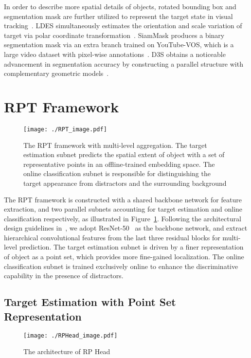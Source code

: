 \documentclass[runningheads]{llncs}
\begin{document}
In order to describe more spatial details of objects, rotated bounding box and segmentation mask are further utilized to represent the target state in visual tracking~\cite{ldes,siamMask,D3S}. LDES simultaneously estimates the orientation and scale variation of target via polar coordinate transformation~\cite{ldes}. SiamMask produces a binary segmentation mask via an extra branch trained on YouTube-VOS\cite{youtubevos}, which is a large video dataset with pixel-wise annotations~\cite{siamMask}. D3S obtains a noticeable advancement in segmentation accuracy by constructing a parallel structure with complementary geometric models~\cite{D3S}.


\section{RPT Framework}


\begin{figure}[t]
\centering
\texttt{[image: ./RPT\_image.pdf]}
\caption{The RPT framework with multi-level aggregation. The target estimation subnet predicts the spatial extent of object with a set of representative points in an offline-trained embedding space. The online classification subnet is responsible for distinguishing the target appearance from distractors and the surrounding background}
\label{fig:RPT_structure}
\end{figure}

The RPT framework is constructed with a shared backbone network for
feature extraction, and two parallel subnets accounting for
target estimation and online classification respectively, as illustrated in Figure~\ref{fig:RPT_structure}. Following the architectural
design guidelines in~\cite{CIR}, we adopt ResNet-50~\cite{resnet50} as the backbone
network, and extract hierarchical convolutional features from the last
three residual blocks for multi-level prediction. The target estimation
subnet is driven by a finer representation of object as a point set,
which provides more fine-gained localization. The online classification
subnet is trained exclusively online to enhance the discriminative capability in the presence of distractors.

\subsection{Target Estimation with Point Set Representation}

\begin{figure}[t]
\centering
\texttt{[image: ./RPHead\_image.pdf]}
\caption{The architecture of RP Head}
\label{fig:RPHead}
\end{figure}
\end{document}
